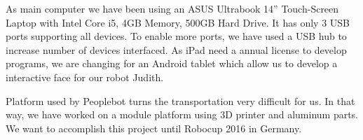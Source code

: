 As main computer we have been using an ASUS Ultrabook 14'' Touch-Screen Laptop with Intel Core i5, 4GB Memory, 500GB Hard Drive. It has only 3 USB ports supporting all devices. To enable more ports, we have used a USB hub to increase number of devices interfaced. As iPad need a annual license to develop programs, we are changing for an Android tablet which allow us to develop a interactive face for our robot Judith.

Platform used by Peoplebot turns the transportation very difficult for us. In that way, we have worked on a module platform using 3D printer and aluminum parts. We want to accomplish this project until Robocup 2016 in Germany.